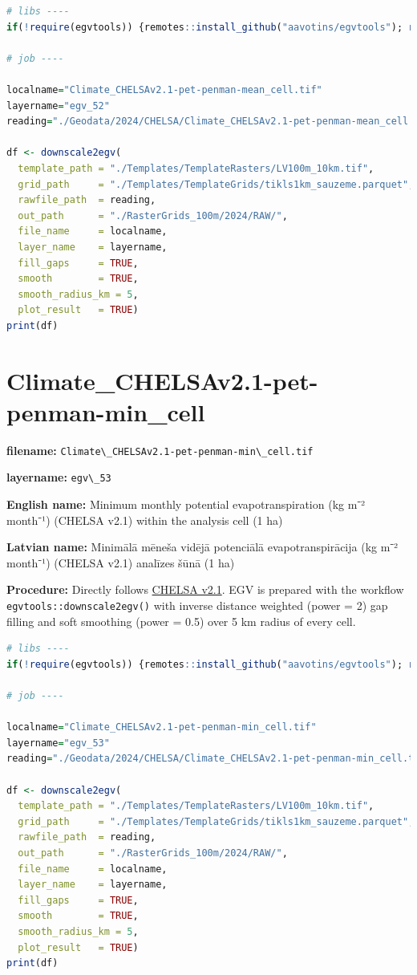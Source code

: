 \documentclass[
]{book}
\newcommand{\passthrough}[1]{#1}
\begin{document}
\begin{lstlisting}[language=R]
# libs ----
if(!require(egvtools)) {remotes::install_github("aavotins/egvtools"); require(egvtools)}

# job ----

localname="Climate_CHELSAv2.1-pet-penman-mean_cell.tif"
layername="egv_52"
reading="./Geodata/2024/CHELSA/Climate_CHELSAv2.1-pet-penman-mean_cell.tif"

df <- downscale2egv(
  template_path = "./Templates/TemplateRasters/LV100m_10km.tif",
  grid_path     = "./Templates/TemplateGrids/tikls1km_sauzeme.parquet",
  rawfile_path  = reading,
  out_path      = "./RasterGrids_100m/2024/RAW/",
  file_name     = localname,
  layer_name    = layername,
  fill_gaps     = TRUE,
  smooth        = TRUE,
  smooth_radius_km = 5,
  plot_result   = TRUE)
print(df)
\end{lstlisting}

\section{Climate\_CHELSAv2.1-pet-penman-min\_cell}\label{ch06.053}

\textbf{filename:} \passthrough{\lstinline!Climate\_CHELSAv2.1-pet-penman-min\_cell.tif!}

\textbf{layername:} \passthrough{\lstinline!egv\_53!}

\textbf{English name:} Minimum monthly potential evapotranspiration (kg m⁻² month⁻¹) (CHELSA v2.1) within the analysis cell (1 ha)

\textbf{Latvian name:} Minimālā mēneša vidējā potenciālā evapotranspirācija (kg m⁻² month⁻¹) (CHELSA v2.1) analīzes šūnā (1 ha)

\textbf{Procedure:} Directly follows \hyperref[Ch04.11]{CHELSA v2.1}. EGV is prepared with the
workflow \passthrough{\lstinline!egvtools::downscale2egv()!} with inverse distance weighted (power = 2)
gap filling and soft smoothing (power = 0.5) over 5 km radius of every cell.

\begin{lstlisting}[language=R]
# libs ----
if(!require(egvtools)) {remotes::install_github("aavotins/egvtools"); require(egvtools)}

# job ----

localname="Climate_CHELSAv2.1-pet-penman-min_cell.tif"
layername="egv_53"
reading="./Geodata/2024/CHELSA/Climate_CHELSAv2.1-pet-penman-min_cell.tif"

df <- downscale2egv(
  template_path = "./Templates/TemplateRasters/LV100m_10km.tif",
  grid_path     = "./Templates/TemplateGrids/tikls1km_sauzeme.parquet",
  rawfile_path  = reading,
  out_path      = "./RasterGrids_100m/2024/RAW/",
  file_name     = localname,
  layer_name    = layername,
  fill_gaps     = TRUE,
  smooth        = TRUE,
  smooth_radius_km = 5,
  plot_result   = TRUE)
print(df)
\end{lstlisting}
\end{document}
